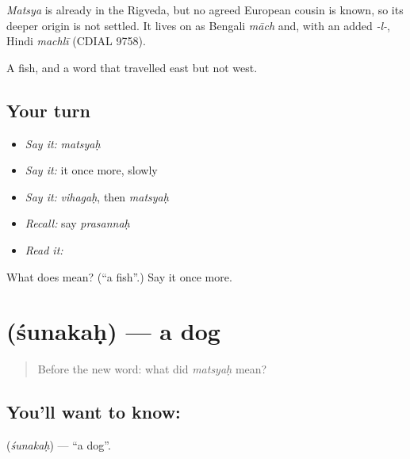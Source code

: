 \begin{cousinweb}
\emph{Matsya} is already in the Rigveda, but no agreed European cousin is known, so its deeper origin is not settled. It lives on as Bengali \emph{māch} and, with an added \emph{-l-}, Hindi \emph{machlī} (CDIAL 9758).
\end{cousinweb}

\begin{grammarlens}[title={What you've built}]
A fish, and a word that travelled east but not west.
\end{grammarlens}

\subsection*{Your turn}
\begin{itemize}
\raggedright
  \item \emph{Say it:} \emph{matsyaḥ}
  \item \emph{Say it:} it once more, slowly
  \item \emph{Say it:} \emph{vihagaḥ}, then \emph{matsyaḥ}
  \item \emph{Recall:} say \emph{prasannaḥ}
  \item \emph{Read it:} \textbf{}
\end{itemize}

\begin{tcolorbox}[breakable,colback=teal!4,colframe=teal!35!black,title={Before you move on}]
What does  mean? (\textquotedblleft{}a fish\textquotedblright{}.) Say it once more.
\end{tcolorbox}
\section[\texorpdfstring{\sk{शुनकः} (śunakaḥ)}{शुनकः (śunakaḥ)}]{ (śunakaḥ) — a dog}

\label{lesson:SA-C39-dog}



\begin{quote}
Before the new word: what did \emph{matsyaḥ} mean?
\end{quote}

\subsection*{You'll want to know: }
\textbf{} (\emph{śunakaḥ}) — \textquotedblleft{}a dog\textquotedblright{}.

